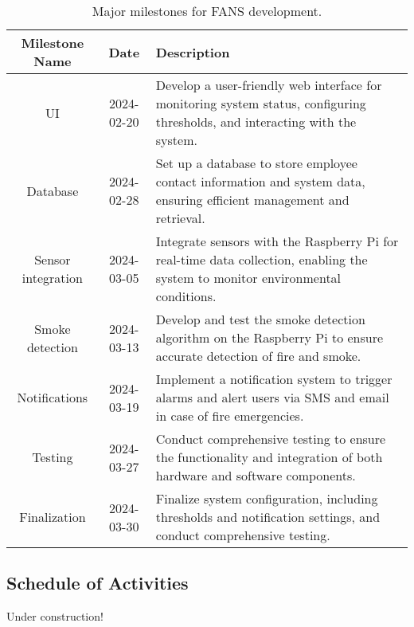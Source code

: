 \begin{table}[H]
    \centering
    \begin{tabular}{| c | c | p{9cm} |}
        \hline
        \textbf{Milestone Name} & \textbf{Date} & \textbf{Description}                                                                            \\
        \hline
        UI                      & 2024-02-20    & Develop a user-friendly web interface for monitoring system status, configuring thresholds, and
        interacting with the system.                                                                                                              \\
        \hline Database         & 2024-02-28    & Set up a database to store employee contact information
        and system data, ensuring efficient management and retrieval.                                                                             \\
        \hline
        Sensor integration      & 2024-03-05    & Integrate sensors with the Raspberry Pi for real-time data collection, enabling the
        system to monitor environmental conditions.                                                                                               \\
        \hline Smoke detection  & 2024-03-13    & Develop and test
        the smoke detection algorithm on the Raspberry Pi to ensure accurate detection of fire and smoke.                                         \\
        \hline
        Notifications           & 2024-03-19    & Implement a notification system to trigger alarms and alert users via SMS and email
        in case of fire emergencies.                                                                                                              \\
        \hline
        Testing                 & 2024-03-27    & Conduct comprehensive testing to ensure the functionality and integration of both
        hardware and software components.                                                                                                         \\
        \hline
        Finalization            & 2024-03-30    & Finalize system configuration, including thresholds and notification settings, and
        conduct comprehensive testing.                                                                                                            \\
        \hline
    \end{tabular}
    \caption{Major milestones for FANS development.}
\end{table}

\subsection{Schedule of Activities}

Under construction!

